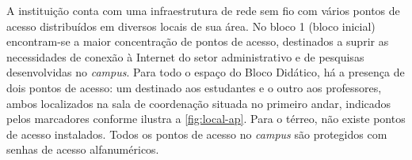 \begin{figure}[H]
	\centering
\end{figure}


A instituição conta com uma infraestrutura de rede sem fio com vários pontos de acesso distribuídos em diversos locais de sua área. No bloco 1 (bloco inicial) encontram-se a maior concentração de pontos de acesso, destinados a suprir as necessidades de conexão à Internet do setor administrativo e de pesquisas desenvolvidas no \textit{campus}. Para todo o espaço do Bloco Didático, há a presença de dois pontos de acesso: um destinado aos estudantes e o outro aos professores, ambos localizados na sala de coordenação situada no primeiro andar, indicados pelos marcadores conforme ilustra a \autoref{fig:local-ap}. Para o térreo, não existe pontos de acesso instalados. Todos os pontos de acesso no \textit{campus} são protegidos com senhas de acesso alfanuméricos.

